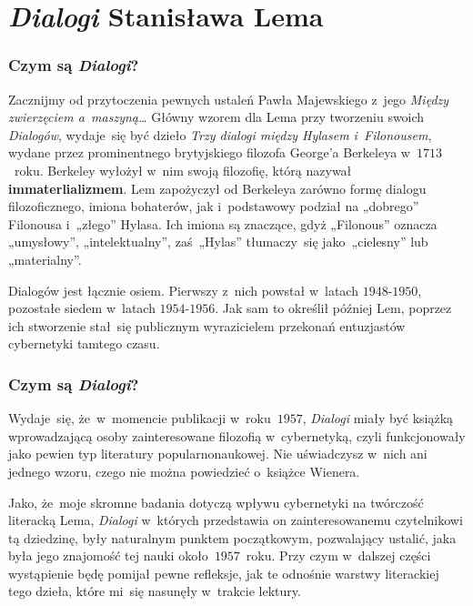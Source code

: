 \documentclass[10pt,t]{beamer}
\begin{document}
\section{\textit{Dialogi} Stanisława Lema}



\begin{frame}
  \frametitle{Czym są \textit{Dialogi}?}


  Zacznijmy od przytoczenia pewnych ustaleń Pawła Majewskiego z~jego
  \textit{Między zwierzęciem a~maszyną\ldots} Główny wzorem dla Lema przy
  tworzeniu swoich \textit{Dialogów}, wydaje~się być dzieło \textit{Trzy
    dialogi między Hylasem i~Filonousem}, wydane przez prominentnego
  brytyjskiego filozofa
  {George’a Berkeleya} w~$1713$~roku. Berkeley wyłożył w~nim swoją
  filozofię, którą nazywał \textbf{immaterlializmem}. Lem zapożyczył od
  Berkeleya zarówno formę dialogu filozoficznego, imiona bohaterów, jak
  i~podstawowy podział na „dobrego” Filonousa i~„złego” Hylasa. Ich imiona
  są znaczące, gdyż „Filonous” oznacza „umysłowy”, „intelektualny”,
  zaś~„Hylas” tłumaczy~się jako~„cielesny” lub „materialny”.

  Dialogów jest łącznie osiem. Pierwszy z~nich powstał w~latach
  $1948\text{-}1950$, pozostałe siedem w~latach $1954\text{-}1956$. Jak sam
  to określił później Lem, poprzez ich stworzenie stał~się publicznym
  wyrazicielem przekonań entuzjastów cybernetyki tamtego czasu.

\end{frame}





\begin{frame}
  \frametitle{Czym są \textit{Dialogi}?}


  Wydaje~się, że~w~momencie publikacji w~roku~$1957$, \textit{Dialogi} miały
  być książką wprowadzającą osoby zainteresowane filozofią w~cybernetyką,
  czyli funkcjonowały jako pewien typ literatury popularnonaukowej.
  Nie uświadczysz w~nich ani jednego wzoru, czego nie można powiedzieć
  o~książce Wienera.

  Jako, że~moje skromne badania dotyczą wpływu cybernetyki na twórczość
  literacką Lema, \textit{Dialogi} w~których przedstawia on zainteresowanemu
  czytelnikowi tą dziedzinę, były naturalnym punktem początkowym,
  pozwalający ustalić, jaka była jego znajomość tej nauki
  około~$1957$~roku. Przy czym w~dalszej części wystąpienie będę pomijał
  pewne refleksje, jak te odnośnie warstwy literackiej tego dzieła, które
  mi~się nasunęły w~trakcie lektury.

\end{frame}
\end{document}
